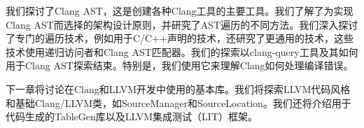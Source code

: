 我们探讨了Clang AST，这是创建各种Clang工具的主要工具。我们了解了为实现Clang AST而选择的架构设计原则，并研究了AST遍历的不同方法。我们深入探讨了专门的遍历技术，例如用于C/C++声明的技术，还研究了更通用的技术，这些技术使用递归访问者和Clang AST匹配器。我们的探索以clang-query工具及其如何用于Clang AST探索结束。特别是，我们使用它来理解Clang如何处理编译错误。

下一章将讨论在Clang和LLVM开发中使用的基本库。我们将探索LLVM代码风格和基础Clang/LLVM类，如SourceManager和SourceLocation。我们还将介绍用于代码生成的TableGen库以及LLVM集成测试（LIT）框架。